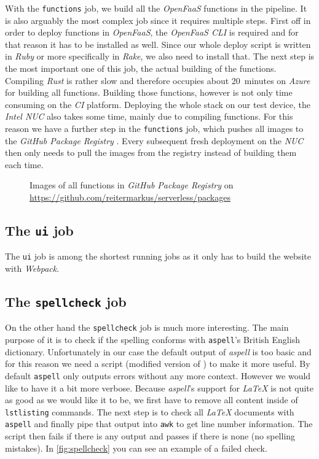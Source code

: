 With the \texttt{functions} job, we build all the \textit{OpenFaaS} functions in the pipeline. It is
also arguably the most complex job since it requires multiple steps. First off in order to deploy
functions in \textit{OpenFaaS}, the \textit{OpenFaaS CLI} \cite{faas-cli} is required and for that
reason it has to be installed as well. Since our whole deploy script is written in \textit{Ruby} or
more specifically in \textit{Rake}, we also need to install that. The next step is the most important
one of this job, the actual building of the functions. Compiling \textit{Rust} is rather slow and
therefore occupies about 20~minutes on \textit{Azure} for building all functions. Building those
functions, however is not only time consuming on the \textit{CI} platform. Deploying the whole stack
on our test device, the \textit{Intel NUC} also takes some time, mainly due to compiling functions.
For this reason we have a further step in the \texttt{functions} job, which pushes all images to the
\textit{GitHub Package Registry} \cite{github-registry}. Every subsequent fresh deployment on the
\textit{NUC} then only needs to pull the images from the registry instead of building them each time.

\begin{figure}[H]
  \centering
  \caption{Images of all functions in \textit{GitHub Package Registry} on \\
    \url{https://github.com/reitermarkus/serverless/packages}}
\end{figure}

\subsection{The \texttt{ui} job}

The \texttt{ui} job is among the shortest running jobs as it only has to build the website with
\textit{Webpack}.

\subsection{The \texttt{spellcheck} job}

On the other hand the \texttt{spellcheck} job is much more interesting. The main purpose of it is
to check if the spelling conforms with \texttt{aspell}'s British English dictionary. Unfortunately
in our case the default output of \textit{aspell} is too basic and for this reason we need a script
(modified version of \cite{aspell-awk}) to make it more useful. By default \texttt{aspell} only
outputs errors without any more context. However we would like to have it a bit more verbose.
Because \textit{aspell}'s support for \textit{LaTeX} is not quite as good as we would like it to be,
we first have to remove all content inside of \texttt{lstlisting} commands. The next step is to
check all \textit{LaTeX} documents with \texttt{aspell} and finally pipe that output into
\texttt{awk} to get line number information. The script then fails if there is any output
and passes if there is none (no spelling mistakes). In \autoref{fig:spellcheck} you can see an
example of a failed check.

